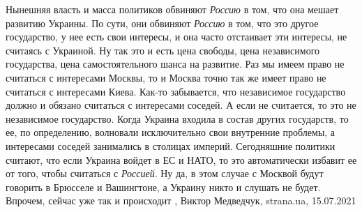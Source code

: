 Нынешняя власть и масса политиков обвиняют \emph{Россию} в том, что она мешает
развитию Украины. По сути, они обвиняют \emph{Россию} в том, что это другое
государство, у нее есть свои интересы, и она часто отстаивает эти интересы, не
считаясь с Украиной. Ну так это и есть цена свободы, цена независимого
государства, цена самостоятельного шанса на развитие. Раз мы имеем право не
считаться с интересами Москвы, то и Москва точно так же имеет право не
считаться с интересами Киева. Как-то забывается, что независимое государство
должно и обязано считаться с интересами соседей. А если не считается, то это не
независимое государство. Когда Украина входила в состав других государств, то
ее, по определению, волновали исключительно свои внутренние проблемы, а
интересами соседей занимались в столицах империй.  Сегодняшние политики
считают, что если Украина войдет в ЕС и НАТО, то это автоматически избавит ее
от того, чтобы считаться с \emph{Россией}. Ну да, в этом случае с Москвой будут
говорить в Брюсселе и Вашингтоне, а Украину никто и слушать не будет. Впрочем,
сейчас уже так и происходит
, 
Виктор Медведчук, strana.ua, 15.07.2021
